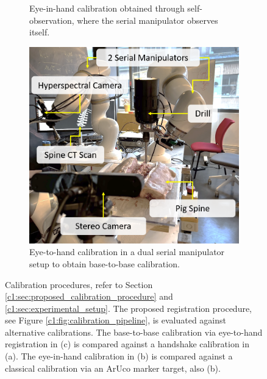 \begin{figure}
\begin{subfigure}[b]{0.3\textwidth}
         \caption{Eye-in-hand calibration obtained through self-observation, where the serial manipulator observes itself.}
         \label{c1:fig:eye_in_hand}
     \end{subfigure}
     \hfill
     \begin{subfigure}[b]{0.3\textwidth}
         \centering
         \includegraphics[width=\textwidth]{fig/eye_to_hand.png}
         \caption{Eye-to-hand calibration in a dual serial manipulator setup to obtain base-to-base calibration.}
         \label{c1:fig:eye_to_hand}
     \end{subfigure}
    \caption{Calibration procedures, refer to Section \ref{c1:sec:proposed_calibration_procedure} and \ref{c1:sec:experimental_setup}. The proposed registration procedure, see Figure \ref{c1:fig:calibration_pipeline}, is evaluated against alternative calibrations. The base-to-base calibration via eye-to-hand registration in (c) is compared against a handshake calibration in (a). The eye-in-hand calibration in (b) is compared against a classical calibration via an ArUco marker target, also (b).}
    \label{c1:fig:calibrations}
\end{figure}

